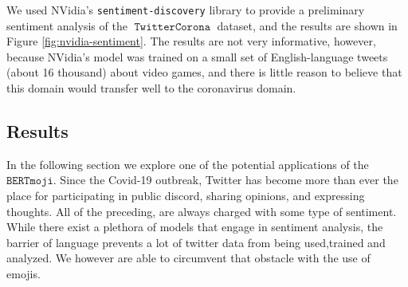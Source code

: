 \documentclass[11pt]{article}
\newcommand{\bertmoji}{\texttt{BERTmoji}}
\DeclareMathOperator{\corona}{\texttt{TwitterCorona}}
\begin{document}
We used NVidia's \texttt{sentiment-discovery} library to provide a preliminary sentiment analysis of the $\corona$ dataset,
and the results are shown in Figure \ref{fig:nvidia-sentiment}.
The results are not very informative, however, because NVidia's model was trained on a small set of English-language tweets (about 16 thousand) about video games,
and there is little reason to believe that this domain would transfer well to the coronavirus domain.


\subsection{Results}

In the following section we explore one of the potential applications of the $\bertmoji$.
Since the Covid-19 outbreak, Twitter has become more than ever the place for participating in public discord, 
sharing opinions, and expressing thoughts. All of the preceding, are always charged with some type of sentiment.
While there exist a plethora of models that engage in sentiment analysis, the barrier of language prevents a lot 
of twitter data from being used,trained and analyzed. We however are able to circumvent that obstacle with the use of emojis.
\end{document}
